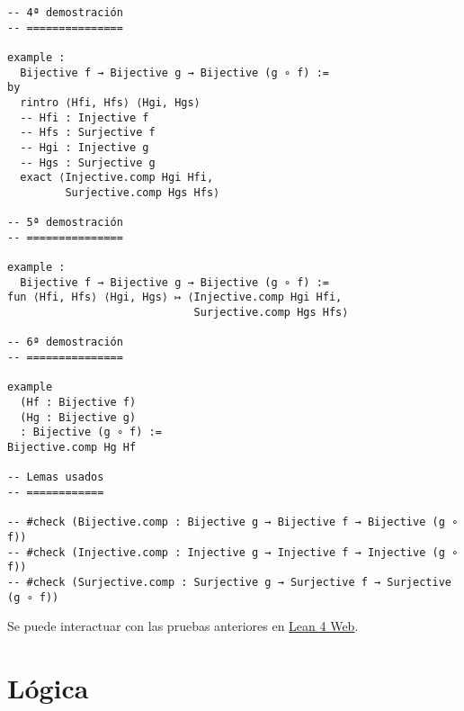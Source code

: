 \begin{verbatim}
-- 4ª demostración
-- ===============

example :
  Bijective f → Bijective g → Bijective (g ∘ f) :=
by
  rintro ⟨Hfi, Hfs⟩ ⟨Hgi, Hgs⟩
  -- Hfi : Injective f
  -- Hfs : Surjective f
  -- Hgi : Injective g
  -- Hgs : Surjective g
  exact ⟨Injective.comp Hgi Hfi,
         Surjective.comp Hgs Hfs⟩

-- 5ª demostración
-- ===============

example :
  Bijective f → Bijective g → Bijective (g ∘ f) :=
fun ⟨Hfi, Hfs⟩ ⟨Hgi, Hgs⟩ ↦ ⟨Injective.comp Hgi Hfi,
                             Surjective.comp Hgs Hfs⟩

-- 6ª demostración
-- ===============

example
  (Hf : Bijective f)
  (Hg : Bijective g)
  : Bijective (g ∘ f) :=
Bijective.comp Hg Hf

-- Lemas usados
-- ============

-- #check (Bijective.comp : Bijective g → Bijective f → Bijective (g ∘ f))
-- #check (Injective.comp : Injective g → Injective f → Injective (g ∘ f))
-- #check (Surjective.comp : Surjective g → Surjective f → Surjective (g ∘ f))
\end{verbatim}
Se puede interactuar con las pruebas anteriores en \href{https://lean.math.hhu.de/\#url=https://raw.githubusercontent.com/jaalonso/Calculemus2/main/src/La\_composicion\_de\_funciones\_biyectivas\_es\_biyectiva.lean}{Lean 4 Web}.

\chapter{Lógica}
\label{sec:org71b7569}

